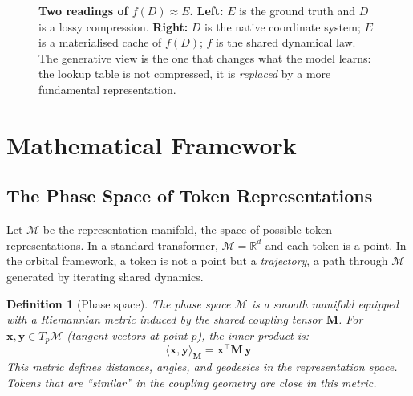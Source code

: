 \documentclass[11pt, a4paper]{article}
\newcommand{\M}{\mathbf{M}}
\newcommand{\x}{\mathbf{x}}
\newcommand{\R}{\mathbb{R}}
\newcommand{\calM}{\mathcal{M}}
\newtheorem{definition}{Definition}
\theoremstyle{remark}
\begin{document}
\begin{figure}[h]
\caption{\textbf{Two readings of $f(D) \approx E$.}
\textbf{Left:} $E$ is the ground truth and $D$ is a lossy compression.
\textbf{Right:} $D$ is the native coordinate system; $E$ is a materialised cache of $f(D)$;
$f$ is the shared dynamical law.
The generative view is the one that changes what the model learns:
the lookup table is not compressed, it is \emph{replaced} by a more fundamental representation.}
\label{fig:two-views}
\end{figure}


\section{Mathematical Framework}

\subsection{The Phase Space of Token Representations}

Let $\calM$ be the representation manifold, the space of possible token representations.
In a standard transformer, $\calM = \R^d$ and each token is a point.
In the orbital framework, a token is not a point but a \emph{trajectory}, a path through $\calM$ generated by iterating shared dynamics.

\begin{definition}[Phase space]
The phase space $\calM$ is a smooth manifold equipped with a Riemannian metric induced by the shared coupling tensor $\M$.
For $\x, \mathbf{y} \in T_p\calM$ (tangent vectors at point $p$), the inner product is:
\[
    \langle \x, \mathbf{y} \rangle_\M = \x^\top \M\, \mathbf{y}
\]
This metric defines distances, angles, and geodesics in the representation space.
Tokens that are ``similar'' in the coupling geometry are close in this metric.
\end{definition}
\end{document}
